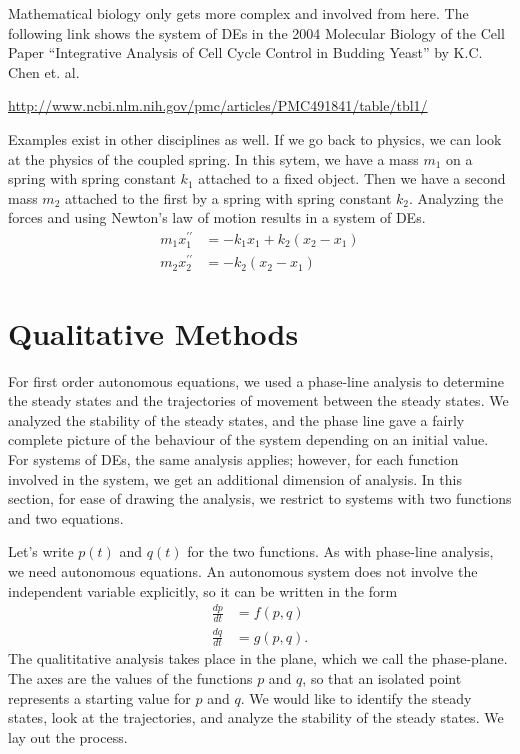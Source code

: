 \documentclass[fleqn,letterpaper]{report}
\begin{document}
Mathematical biology only gets more complex and involved from
here. The following link shows the system of DEs in the 2004
Molecular Biology of the Cell Paper ``Integrative Analysis of
Cell Cycle Control in Budding Yeast'' by K.C. Chen et. al.

\url{http://www.ncbi.nlm.nih.gov/pmc/articles/PMC491841/table/tbl1/}

Examples exist in other disciplines as well. If we go back to
physics, we can look at the physics of the coupled spring. In
this sytem, we have a mass $m_1$ on a spring with spring
constant $k_1$ attached to a fixed object. Then we have a
second mass $m_2$ attached to the first by a spring with
spring constant $k_2$. Analyzing the forces and using Newton's law
of motion results in a system of DEs.
\begin{align*}
m_1x_1^{\prime \prime} & = - k_1x_1 + k_2(x_2 - x_1) \\
m_2x_2^{\prime \prime} & = -k_2(x_2-x_1) 
\end{align*}

\section{Qualitative Methods}
\label{systems-qualitative-methods}

For first order autonomous equations, we used a phase-line
analysis to determine the steady states and the trajectories
of movement between the steady states. We analyzed the
stability of the steady states, and the phase line gave a
fairly complete picture of the behaviour of the system
depending on an initial value. For systems of DEs, the same
analysis applies; however, for each function involved in the
system, we get an additional dimension of analysis. In this
section, for ease of drawing the analysis, we restrict to
systems with two functions and two equations.

Let's write $p(t)$ and $q(t)$ for the two functions. As with
phase-line analysis, we need autonomous equations. An
autonomous system does not involve the independent variable
explicitly, so it can be written in the form
\begin{align*}
\frac{dp}{dt} & = f(p,q) \\
\frac{dq}{dt} & = g(p,q).
\end{align*}
The qualititative analysis takes place in the plane, which we
call the phase-plane. The axes are the values of the
functions $p$ and $q$, so that an isolated point represents a
starting value for $p$ and $q$. We would like to identify
the steady states, look at the trajectories, and analyze the
stability of the steady states. We lay out the process.
\end{document}
